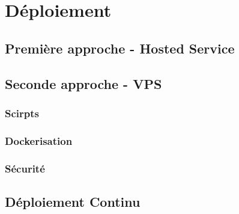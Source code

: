 \section{Déploiement}
\subsection{Première approche - Hosted Service}

\subsection{Seconde approche - VPS}
\subsubsection{Scirpts}
\subsubsection{Dockerisation}
\subsubsection{Sécurité}


\subsection{Déploiement Continu}
